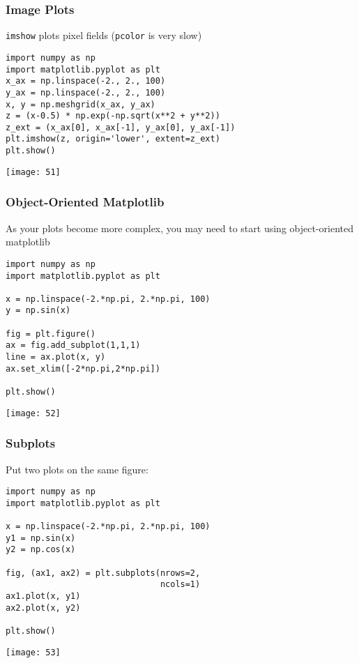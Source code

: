 \begin{frame}[fragile]
    \frametitle{Image Plots}

    \lstinline|imshow| plots pixel fields (\lstinline|pcolor| is very slow)
    \begin{lstlisting}
import numpy as np
import matplotlib.pyplot as plt
x_ax = np.linspace(-2., 2., 100)
y_ax = np.linspace(-2., 2., 100)
x, y = np.meshgrid(x_ax, y_ax)
z = (x-0.5) * np.exp(-np.sqrt(x**2 + y**2))
z_ext = (x_ax[0], x_ax[-1], y_ax[0], y_ax[-1])
plt.imshow(z, origin='lower', extent=z_ext)
plt.show()
    \end{lstlisting}
\begin{center}
\texttt{[image: 51]}
\end{center}
\end{frame}

\begin{frame}[fragile]
    \frametitle{Object-Oriented Matplotlib}
    As your plots become more complex, you may need to start using object-oriented matplotlib
    \begin{lstlisting}
import numpy as np
import matplotlib.pyplot as plt

x = np.linspace(-2.*np.pi, 2.*np.pi, 100)
y = np.sin(x)

fig = plt.figure()
ax = fig.add_subplot(1,1,1)
line = ax.plot(x, y)
ax.set_xlim([-2*np.pi,2*np.pi])

plt.show()
    \end{lstlisting}
\begin{center}
\texttt{[image: 52]}
\end{center}
\end{frame}

\begin{frame}[fragile]\frametitle{Subplots}

    Put two plots on the same figure:
    \begin{lstlisting}
import numpy as np
import matplotlib.pyplot as plt

x = np.linspace(-2.*np.pi, 2.*np.pi, 100)
y1 = np.sin(x)
y2 = np.cos(x)

fig, (ax1, ax2) = plt.subplots(nrows=2,
                               ncols=1)
ax1.plot(x, y1)
ax2.plot(x, y2)

plt.show()
    \end{lstlisting}
\begin{center}
\texttt{[image: 53]}
\end{center}
\end{frame}

